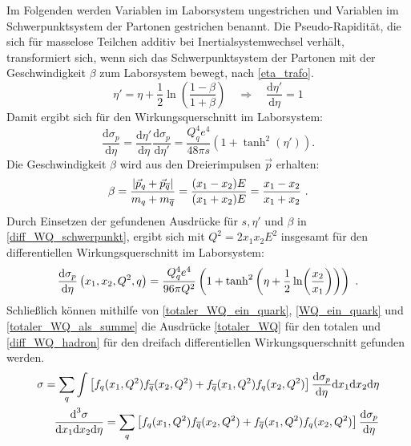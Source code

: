 Im Folgenden werden Variablen im Laborsystem ungestrichen und Variablen im Schwerpunktsystem der Partonen gestrichen benannt. Die Pseudo-Rapidität, die sich für masselose Teilchen additiv bei Inertialsystemwechsel verhält, transformiert sich, wenn sich das Schwerpunktsystem der Partonen mit der Geschwindigkeit $\beta$ zum Laborsystem bewegt, nach \textsf{\autoref{eta_trafo}}.
\begin{equation}
\eta' = \eta + \frac{1}{2}\ln(\frac{1-\beta}{1+\beta}) \quad \Rightarrow \quad \frac{\text{d}\eta'}{\text{d}\eta} = 1 
\label{eta_trafo}
\end{equation}
Damit ergibt sich für den Wirkungsquerschnitt im Laborsystem: 
\begin{equation}
\frac{\text{d}\sigma_p}{\text{d}\eta} = \frac{\text{d}\eta'}{\text{d}\eta} \frac{\text{d}\sigma_p}{\text{d}\eta'} = \frac{Q_q^4e^4}{48\pi s}(1+\tanh^2(\eta')).
\label{diff_WQ_schwerpunkt}
\end{equation}
Die Geschwindigkeit $\beta$  wird aus den Dreierimpulsen $\vec{p}$ erhalten:
\begin{equation}
\beta = \frac{\abs{\vec{p}_q + \vec{p}_{\overline{q}}}}{m_q + m_{\overline{q}}} = \frac{(x_1 - x_2)E}{(x_1 + x_2)E} = \frac{x_1 - x_2}{x_1 + x_2}~.
\label{beta}
\end{equation}
Durch Einsetzen der gefundenen Ausdrücke für $s, \eta'$ und $\beta$ in \textsf{\autoref{diff_WQ_schwerpunkt}}, ergibt sich mit $Q^2 = 2 x_1 x_2 E^2$ insgesamt für den differentiellen Wirkungsquerschnitt im Laborsystem:
\begin{equation}
\derivative{\sigma_p}{\eta}\left(x_1, x_2, Q^2, q\right) = \frac{Q_q^4e^4}{96\pi Q^2} \left(1+\tanh^2\left(\eta + \frac{1}{2}\ln(\frac{x_2}{x_1})\right)\right)~.
\label{diff_WQ_labor}
\end{equation}
Schließlich können mithilfe von \textsf{\autoref{totaler_WQ_ein_quark}}, \textsf{\autoref{WQ_ein_quark}} und \textsf{\autoref{totaler_WQ_als_summe}} die Ausdrücke \textsf{\autoref{totaler_WQ}} für den totalen und \textsf{\autoref{diff_WQ_hadron}} für den dreifach differentiellen Wirkungsquerschnitt gefunden werden.
\begin{align}
\label{totaler_WQ}
\sigma = \sum_{q} \int \left[f_q(x_1, Q^2)f_{\overline{q}}(x_2, Q^2) +f_{\overline{q}}(x_1, Q^2)f_{q}(x_2, Q^2) \right] \derivative{\sigma_p}{\eta} \text{d}x_1\text{d}x_2\text{d}\eta \\
\frac{\text{d}^3\sigma}{\text{d}x_1\text{d}x_2\text{d}\eta} = \sum_{q} \left[f_q(x_1, Q^2)f_{\overline{q}}(x_2, Q^2) +f_{\overline{q}}(x_1, Q^2)f_{q}(x_2, Q^2) \right] \derivative{\sigma_p}{\eta}
\label{diff_WQ_hadron} 
\end{align}
